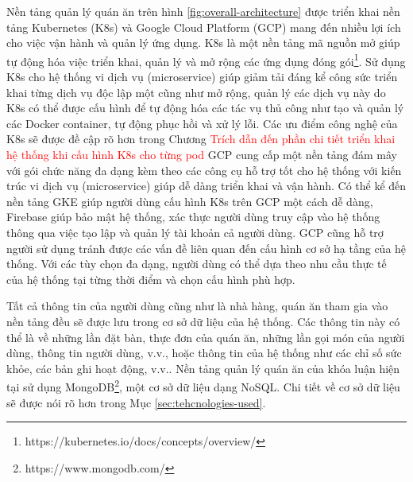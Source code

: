 Nền tảng quản lý quán ăn trên hình \ref{fig:overall-architecture} được triển khai nền tảng Kubernetes (K8s) và Google Cloud Platform (GCP) mang đến nhiều lợi ích cho việc vận hành và quản lý ứng dụng.
K8s là một nền tảng mã nguồn mở giúp tự động hóa việc triển khai, quản lý và mở rộng các ứng dụng đóng gói\footnote{https://kubernetes.io/docs/concepts/overview/}.
Sử dụng K8s cho hệ thống vi dịch vụ (microservice) giúp giảm tải đáng kể công sức triển khai từng dịch vụ độc lập một cũng như mở rộng, quản lý các dịch vụ này do K8s có thể được cấu hình để tự động hóa các tác vụ thủ công như tạo và quản lý các Docker container, tự động phục hồi và xử lý lỗi.
Các ưu điểm công nghệ của K8s sẽ được đề cập rõ hơn trong Chương \textcolor{red}{Trích dẫn đến phần chi tiết triển khai hệ thống khi cấu hình K8s cho từng pod}
GCP cung cấp một nền tảng đám mây với gói chức năng đa dạng kèm theo các công cụ hỗ trợ tốt cho hệ thống với kiến trúc vi dịch vụ (microservice) giúp dễ dàng triển khai và vận hành.
Có thể kể đến nền tảng GKE giúp người dùng cấu hình K8s trên GCP một cách dễ dàng, Firebase giúp bảo mật hệ thống, xác thực người dùng truy cập vào hệ thống thông qua việc tạo lập và quản lý tài khoản cả người dùng.
GCP cũng hỗ trợ người sử dụng tránh được các vấn đề liên quan đến cấu hình cơ sở hạ tầng của hệ thống.
Với các tùy chọn đa dạng, người dùng có thể dựa theo nhu cầu thực tế của hệ thống tại từng thời điểm và chọn cấu hình phù hợp.

Tất cả thông tin của người dùng cũng như là nhà hàng, quán ăn tham gia vào nền tảng đều sẽ được lưu trong cơ sở dữ liệu của hệ thống. Các thông tin này có thể là về những lần đặt bàn, thực đơn của quán ăn, những lần gọi món của người dùng, thông tin người dùng, v.v., hoặc thông tin của hệ thống như các chỉ số sức khỏe, các bản ghi hoạt động, v.v.. Nền tảng quản lý quán ăn của khóa luận hiện tại sử dụng MongoDB\footnote{https://www.mongodb.com/}, một cơ sở dữ liệu dạng NoSQL. Chi tiết về cơ sở dữ liệu sẽ được nói rõ hơn trong Mục \autoref{sec:tehcnologies-used}.

